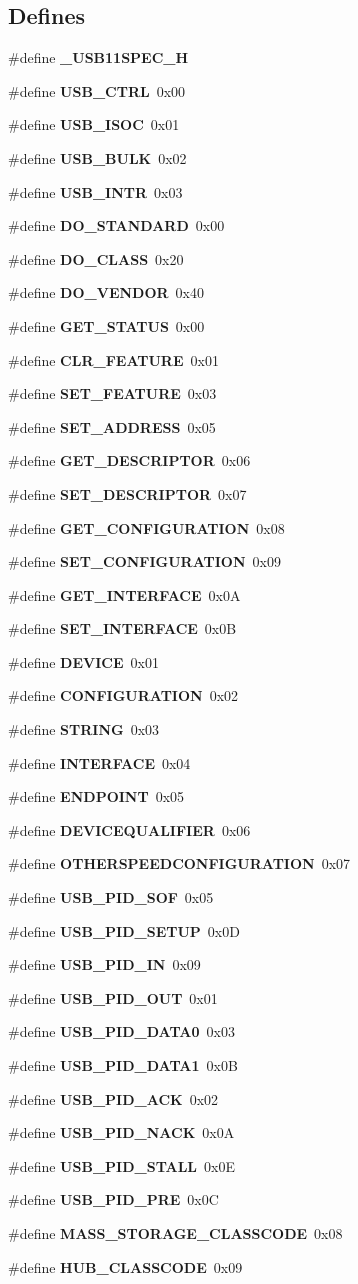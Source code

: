 \subsection*{Defines}
\begin{CompactItemize}
\item 
\#define {\bf \_\-USB11SPEC\_\-H}
\item 
\#define {\bf USB\_\-CTRL}~0x00
\item 
\#define {\bf USB\_\-ISOC}~0x01
\item 
\#define {\bf USB\_\-BULK}~0x02
\item 
\#define {\bf USB\_\-INTR}~0x03
\item 
\#define {\bf DO\_\-STANDARD}~0x00
\item 
\#define {\bf DO\_\-CLASS}~0x20
\item 
\#define {\bf DO\_\-VENDOR}~0x40
\item 
\#define {\bf GET\_\-STATUS}~0x00
\item 
\#define {\bf CLR\_\-FEATURE}~0x01
\item 
\#define {\bf SET\_\-FEATURE}~0x03
\item 
\#define {\bf SET\_\-ADDRESS}~0x05
\item 
\#define {\bf GET\_\-DESCRIPTOR}~0x06
\item 
\#define {\bf SET\_\-DESCRIPTOR}~0x07
\item 
\#define {\bf GET\_\-CONFIGURATION}~0x08
\item 
\#define {\bf SET\_\-CONFIGURATION}~0x09
\item 
\#define {\bf GET\_\-INTERFACE}~0x0A
\item 
\#define {\bf SET\_\-INTERFACE}~0x0B
\item 
\#define {\bf DEVICE}~0x01
\item 
\#define {\bf CONFIGURATION}~0x02
\item 
\#define {\bf STRING}~0x03
\item 
\#define {\bf INTERFACE}~0x04
\item 
\#define {\bf ENDPOINT}~0x05
\item 
\#define {\bf DEVICEQUALIFIER}~0x06
\item 
\#define {\bf OTHERSPEEDCONFIGURATION}~0x07
\item 
\#define {\bf USB\_\-PID\_\-SOF}~0x05
\item 
\#define {\bf USB\_\-PID\_\-SETUP}~0x0D
\item 
\#define {\bf USB\_\-PID\_\-IN}~0x09
\item 
\#define {\bf USB\_\-PID\_\-OUT}~0x01
\item 
\#define {\bf USB\_\-PID\_\-DATA0}~0x03
\item 
\#define {\bf USB\_\-PID\_\-DATA1}~0x0B
\item 
\#define {\bf USB\_\-PID\_\-ACK}~0x02
\item 
\#define {\bf USB\_\-PID\_\-NACK}~0x0A
\item 
\#define {\bf USB\_\-PID\_\-STALL}~0x0E
\item 
\#define {\bf USB\_\-PID\_\-PRE}~0x0C
\item 
\#define {\bf MASS\_\-STORAGE\_\-CLASSCODE}~0x08
\item 
\#define {\bf HUB\_\-CLASSCODE}~0x09
\end{CompactItemize}
